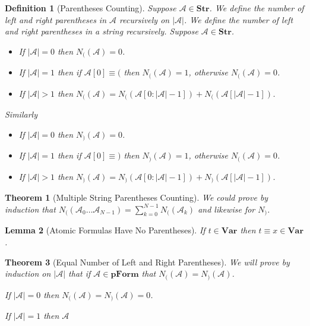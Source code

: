 \documentclass[12pt]{article}
\theoremstyle{break}
\newtheorem{definition}{Definition}[section]
\theoremstyle{break}
\newtheorem{theorem}{Theorem}[section]
\theoremstyle{break}
\theoremstyle{break}
\newtheorem{lemma}[theorem]{Lemma}
\newcommand{\mc}[1]{\mathcal{#1}}
\begin{document}
\begin{definition}[Parentheses Counting]
Suppose $\mc{A}\in\textbf{Str}$.
We define the number of left and right parentheses in $\mc{A}$ recursively on $|\mc{A}|$.
We define the number of left and right parentheses in a string recursively. Suppose $\mc{A}\in\textbf{Str}$.

\begin{itemize}
\item{If $|\mc{A}| = 0$ then $N_{(}(\mc{A}) = 0$.}
\item{If $|\mc{A}| = 1$ then if $\mc{A}[0] \equiv ($ then $N_{(}(\mc{A}) = 1$, otherwise $N_{(}(\mc{A}) = 0$.}
\item{If $|\mc{A}| > 1$ then $N_{(}(\mc{A}) = N_{(}(\mc{A}[0:|\mc{A}|-1]) + N_{(}(\mc{A}[|\mc{A}|-1])$.}
\end{itemize}

Similarly

\begin{itemize}
\item{If $|\mc{A}| = 0$ then $N_{)}(\mc{A}) = 0$.}
\item{If $|\mc{A}| = 1$ then if $\mc{A}[0] \equiv )$ then $N_{)}(\mc{A}) = 1$, otherwise $N_{(}(\mc{A}) = 0$.}
\item{If $|\mc{A}| > 1$ then $N_{)}(\mc{A}) = N_{)}(\mc{A}[0:|\mc{A}|-1]) + N_{)}(\mc{A}[|\mc{A}|-1])$.}
\end{itemize}
\end{definition}

\begin{theorem}[Multiple String Parentheses Counting]
We could prove by induction that $N_{(}(\mc{A}_0\ldots\mc{A}_{N-1}) = \sum_{k=0}^{N-1} N_{(}(\mc{A}_k)$ and likewise for $N_{)}$.
\end{theorem}

\begin{lemma}[Atomic Formulas Have No Parentheses]
If $t\in\textbf{Var}$ then $t\equiv x \in \textbf{Var}$.



\end{lemma}

\begin{theorem}[Equal Number of Left and Right Parentheses]
We will prove by induction on $|\mc{A}|$ that if $\mc{A}\in\textbf{pForm}$ that $N_{(}(\mc{A}) = N_{)}(\mc{A})$.

If $|\mc{A}| = 0$ then $N_{(}(\mc{A}) = N_{)}(\mc{A}) = 0$.

If $|\mc{A}| = 1$ then $\mc{A}$
\end{theorem}
\end{document}
